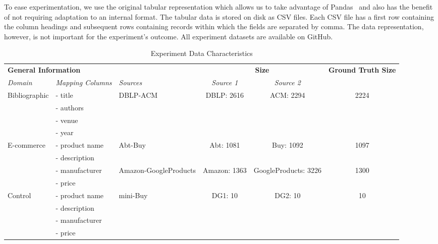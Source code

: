 To ease experimentation, we use the original tabular representation
which allows us to take advantage of Pandas~\cite{pandas2010,pandas2023}
and also has the benefit of not requiring adaptation to an internal format.
The tabular data is stored on disk as CSV files.
Each CSV file has a first row containing the column headings and subsequent
rows containing records within which the fields are separated by comma.
The data representation, however, is not important for the experiment's
outcome. All experiment datasets are available on GitHub\cite{expdata2023}.

\begin{table*}[htbp]
    \centering
    \begin{tabular}{|l|l|l|c|c|c|}
        \bottomrule
        \multicolumn{3}{|l|}{\textbf{General Information}} & \multicolumn{2}{|c|}{\textbf{Size}} & \multirow{2}{*}{\textbf{Ground Truth Size}}\\
        \cline{0-4}
        \textit{Domain} & \textit{Mapping Columns} & \textit{Sources} & \textit{Source 1} & \textit{Source 2} & \\
        \hline
        \multirow{4}{*}{Bibliographic} & - title & \multirow{4}{*}{DBLP-ACM} & \multirow{4}{*}{DBLP: 2616} & \multirow{4}{*}{ACM: 2294} & \multirow{4}{*}{2224} \\
        & - authors & & & &\\
        & - venue & & & &\\
        & - year & & & &\\
        \hline
        \multirow{4}{*}{E-commerce} & - product name & \multirow{2}{*}{Abt-Buy} & \multirow{2}{*}{Abt: 1081} & \multirow{2}{*}{Buy: 1092} & \multirow{2}{*}{1097} \\
        & - description & & & &\\
        \cline{3-6}
        & - manufacturer & \multirow{2}{*}{Amazon-GoogleProducts} & \multirow{2}{*}{Amazon: 1363} & \multirow{2}{*}{GoogleProducts: 3226} & \multirow{2}{*}{1300} \\
        & - price & & & &\\
        \hline
        \multirow{4}{*}{Control} & - product name & \multirow{4}{*}{mini-Buy} & \multirow{4}{*}{DG1: 10} & \multirow{4}{*}{DG2: 10} & \multirow{4}{*}{10} \\
        & - description & & & &\\
        & - manufacturer & & & &\\
        & - price & & & &\\
        \hline
    \end{tabular}
    \caption{Experiment Data Characteristics}\label{tab:dsattrs}
\end{table*}


